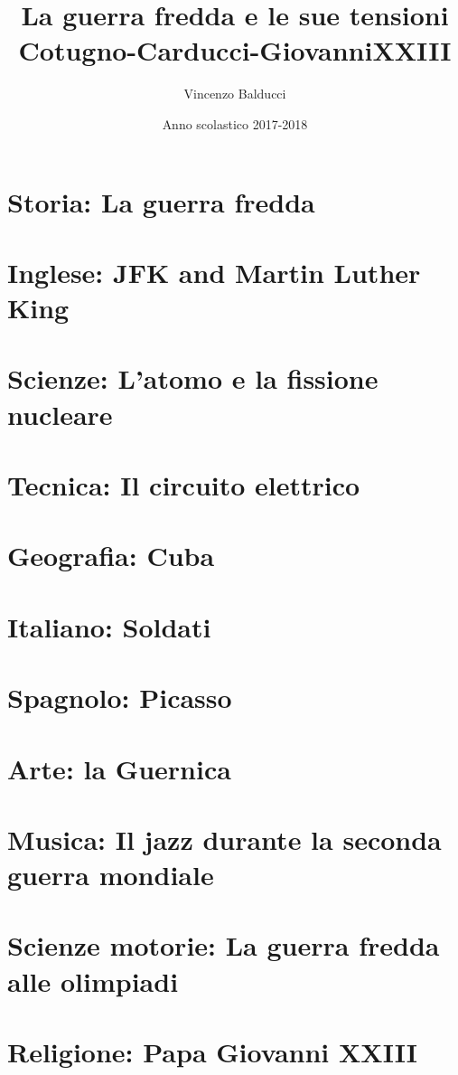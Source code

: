 \documentclass[12pt]{report}
\title{
  {La guerra fredda e le sue tensioni}\\
  {\large Cotugno-Carducci-GiovanniXXIII}
}
\author{Vincenzo Balducci}
\date{Anno scolastico 2017-2018}
\begin{document}
\maketitle

\tableofcontents

\chapter{Storia: La guerra fredda}


\chapter{Inglese: JFK and Martin Luther King}


\chapter{Scienze: L'atomo e la fissione nucleare}


\chapter{Tecnica: Il circuito elettrico}


\chapter{Geografia: Cuba}


\chapter{Italiano: Soldati}


\chapter{Spagnolo: Picasso}


\chapter{Arte: la Guernica}


\chapter{Musica: Il jazz durante la seconda guerra mondiale}


\chapter{Scienze motorie: La guerra fredda alle olimpiadi}


\chapter{Religione: Papa Giovanni XXIII}

\end{document}
